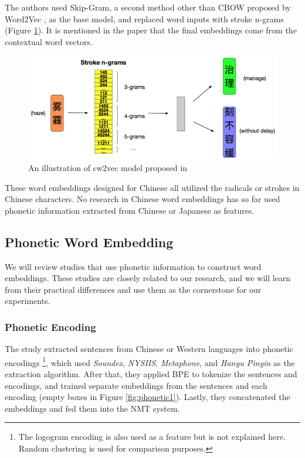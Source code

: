 The authors used Skip-Gram, a second method other than CBOW proposed by Word2Vec \cite{mikolov2013efficient}, as the base model, and replaced word inputs with stroke n-grams (Figure \ref{fig:cw2vec2}). It is mentioned in the paper that the final embeddings come from the contextual word vectors.

\begin{figure}[h]
	\centering
	\includegraphics[scale=0.6]{../images/cw2vec_illustration2.png}
	\caption{An illustration of cw2vec model proposed in \cite{cao2018cw2vec}}
	\label{fig:cw2vec2}
\end{figure}

These word embeddings designed for Chinese all utilized the radicals or strokes in Chinese characters. No research in Chinese word embeddings has so far used phonetic information extracted from Chinese or Japanese as features.

\subsection{Phonetic Word Embedding} \label{sec:rw_pwe}

We will review studies that use phonetic information to construct word embeddings. These studies are closely related to our research, and we will learn from their practical differences and use them as the cornerstone for our experiments.

\subsubsection{Phonetic Encoding}

The study \cite{khan2019diversity} extracted sentences from Chinese or Western languages into phonetic encodings \footnote{The logogram encoding is also used as a feature but is not explained here. Random clustering is used for comparison purposes.}, which used \textit{Soundex}, \textit{NYSIIS}, \textit{Metaphone}, and \textit{Hanyu Pinyin} as the extraction algorithm. After that, they applied BPE \cite{sennrich_neural_2016} to tokenize the sentences and encodings, and trained separate embeddings from the sentences and each encoding (empty boxes in Figure \ref{fig:phonetic1}). Lastly, they concatenated the embeddings and fed them into the NMT system. 

